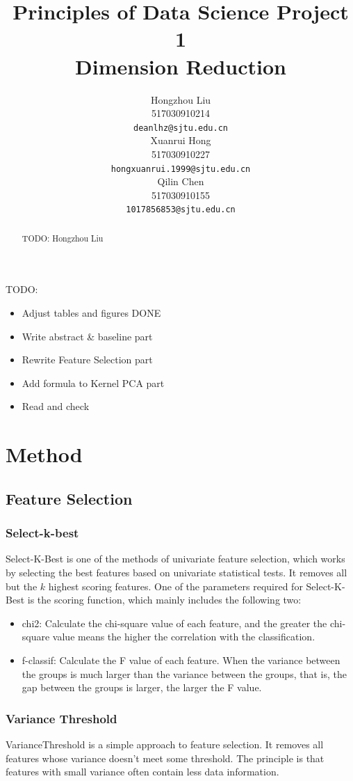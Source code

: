 \documentclass{article}
\title{Principles of Data Science Project 1\\
        Dimension Reduction}
\author{
  Hongzhou Liu \\
  517030910214 \\
  \texttt{deanlhz@sjtu.edu.cn} \\
  \And
  Xuanrui Hong \\
  517030910227 \\
  \texttt{hongxuanrui.1999@sjtu.edu.cn} \\
  \And
  Qilin Chen \\
  517030910155 \\
  \texttt{1017856853@sjtu.edu.cn} \\
}
\begin{document}


\maketitle

TODO:
\begin{itemize}
	\item Adjust tables and figures DONE
	\item Write abstract \& baseline part
	\item Rewrite Feature Selection part
	\item Add formula to Kernel PCA part
	\item Read and check
\end{itemize}

\begin{abstract}
  TODO: Hongzhou Liu\\
\end{abstract}

\section{Method}
\subsection{Feature Selection}
\subsubsection{Select-k-best}
\indent Select-K-Best is one of the methods of univariate feature selection, which works by selecting the best features based on univariate statistical tests. It removes all but the $k$ highest scoring features. One of the parameters required for Select-K-Best is the scoring function, which mainly includes the following two:
\begin{itemize}
	\item chi2: Calculate the chi-square value of each feature, and the greater the chi-square value means the higher the correlation with the classification.
	
	\item f-classif: Calculate the F value of each feature. When the variance between the groups is much larger than the variance between the groups, that is, the gap between the groups is larger, the larger the F value.	
\end{itemize}
\subsubsection{Variance Threshold}
\indent VarianceThreshold is a simple approach to feature selection. It removes all features whose variance doesn’t meet some threshold. The principle is that features with small variance often contain less data information.
\end{document}
